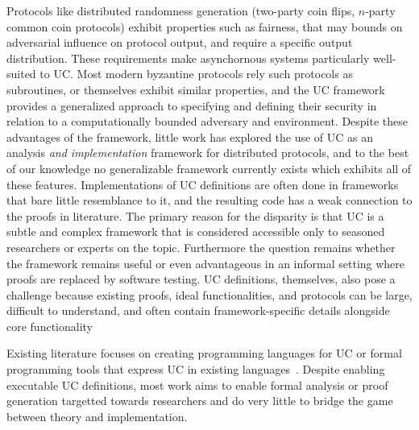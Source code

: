 Protocols like distributed randomness generation (two-party coin flips,
$n$-party common coin protocols) exhibit properties such as fairness, that may
bounds on adversarial influence on protocol output, and require a specific
output distribution.  These requirements make asynchornous systems particularly
well-suited to UC.  Most modern byzantine protocols rely such protocols as
subroutines, or themselves exhibit similar properties, and the UC framework
provides a generalized approach to specifying and defining their security in
relation to a computationally bounded adversary and environment.  Despite these
advantages of the framework, little work has explored the use of UC as an
analysis \emph{and implementation} framework for distributed protocols, and to
the best of our knowledge no generalizable framework currently exists which
exhibits all of these features.  Implementations of UC definitions are often
done in frameworks that bare little resemblance to it, and the resulting code
has a weak connection to the proofs in literature.  The primary reason for the
disparity is that UC is a subtle and complex framework that is considered
accessible only to seasoned researchers or experts on the topic.  Furthermore
the question remains whether the framework remains useful or even advantageous
in an informal setting where proofs are replaced by software testing.  UC
definitions, themselves, also pose a challenge because existing proofs, ideal
functionalities, and protocols can be large, difficult to understand, and often
contain framework-specific details alongside core
functionality~\cite{badertscher2024bitcoin, badertscher2018ouroboros}

Existing literature focuses on creating programming languages for UC or formal
programming tools that express UC in existing
languages~\cite{canetti2019easyuc, liao2019ilc}.  Despite enabling executable
UC definitions, most work aims to enable formal analysis or proof generation
targetted towards researchers and do very little to bridge the game between
theory and implementation.

